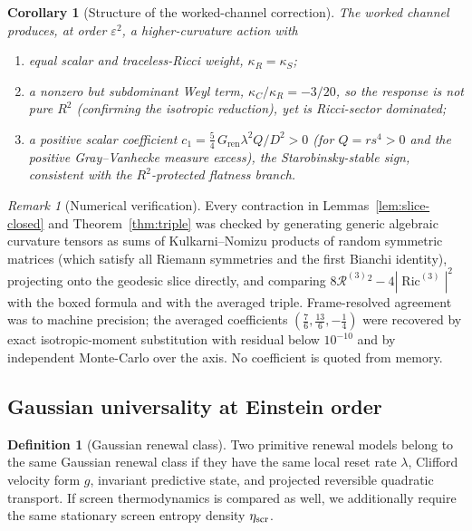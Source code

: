 \documentclass[11pt]{article}
\newtheorem{corollary}[theorem]{Corollary}
\theoremstyle{definition}
\newtheorem{definition}[theorem]{Definition}
\theoremstyle{remark}
\newtheorem{remark}[theorem]{Remark}
\newcommand{\eps}{\varepsilon}
\newcommand{\Ric}{\operatorname{Ric}}
\newcommand{\Gren}{G_{\mathrm{ren}}}
\newcommand{\kR}{\kappa_R}
\newcommand{\kS}{\kappa_S}
\newcommand{\kC}{\kappa_C}
\newcommand{\Rth}{\mathcal R^{(3)}}
\begin{document}
\begin{corollary}[Structure of the worked-channel correction]
\label{cor:structure}
The worked channel produces, at order $\eps^2$, a higher-curvature action with
\begin{enumerate}[leftmargin=1.7em]
\item \emph{equal scalar and traceless-Ricci weight}, $\kR=\kS$;
\item a \emph{nonzero but subdominant Weyl term}, $\kC/\kR=-3/20$, so the response
is \emph{not} pure $R^2$ (confirming the isotropic reduction), yet is Ricci-sector dominated;
\item a \emph{positive scalar coefficient} $c_1=\tfrac54\,\Gren\lambda^2 Q/D^2>0$
(for $Q=rs^4>0$ and the positive Gray--Vanhecke measure excess), the
Starobinsky-stable sign, consistent with the $R^2$-protected
flatness branch.
\end{enumerate}
\end{corollary}

\begin{remark}[Numerical verification]
\label{rem:numerics}
Every contraction in Lemmas~\ref{lem:slice-closed} and Theorem~\ref{thm:triple} was checked
by generating generic algebraic curvature tensors as sums of Kulkarni--Nomizu
products of random symmetric matrices (which satisfy all Riemann symmetries and the
first Bianchi identity), projecting onto the geodesic slice directly, and comparing
$8\Rth{}^2-4|\Ric^{(3)}|^2$ with the boxed formula and with the averaged triple.
Frame-resolved agreement was to machine precision; the averaged coefficients
$(\tfrac76,\tfrac{13}6,-\tfrac14)$ were recovered by exact isotropic-moment
substitution with residual below $10^{-10}$ and by independent Monte-Carlo over the
axis.  No coefficient is quoted from memory.
\end{remark}


\subsection{Gaussian universality at Einstein order}

\begin{definition}[Gaussian renewal class]
\label{def:gaussian-renewal-class}
Two primitive renewal models belong to the same Gaussian renewal class if they
have the same local reset rate $\lambda$, Clifford velocity form $g$, invariant
predictive state, and projected reversible quadratic transport.  If screen
thermodynamics is compared as well, we additionally require the same stationary
screen entropy density $\eta_{\rm scr}$.
\end{definition}
\end{document}
